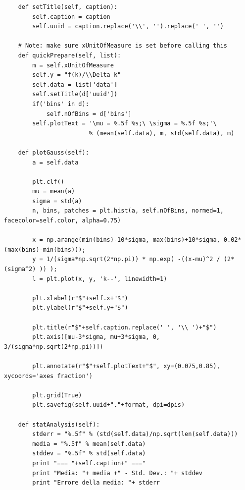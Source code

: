 \documentclass[a4paper,10pt]{report}
\begin{document}
\begin{lstlisting}
    def setTitle(self, caption):
        self.caption = caption
        self.uuid = caption.replace('\\', '').replace(' ', '')
        
    # Note: make sure xUnitOfMeasure is set before calling this
    def quickPrepare(self, list):
        m = self.xUnitOfMeasure
        self.y = "f(k)/\\Delta k"
        self.data = list['data']
        self.setTitle(d['uuid'])
        if('bins' in d):
            self.nOfBins = d['bins']
        self.plotText = '\mu = %.5f %s;\ \sigma = %.5f %s;'\
                        % (mean(self.data), m, std(self.data), m)
        
    def plotGauss(self):
        a = self.data
        
        plt.clf()
        mu = mean(a)
        sigma = std(a)
        n, bins, patches = plt.hist(a, self.nOfBins, normed=1, facecolor=self.color, alpha=0.75)
        
        x = np.arange(min(bins)-10*sigma, max(bins)+10*sigma, 0.02*(max(bins)-min(bins)));
        y = 1/(sigma*np.sqrt(2*np.pi)) * np.exp( -((x-mu)^2 / (2* (sigma^2) )) );
        l = plt.plot(x, y, 'k--', linewidth=1)
        
        plt.xlabel(r"$"+self.x+"$")
        plt.ylabel(r"$"+self.y+"$")
        
        plt.title(r"$"+self.caption.replace(' ', '\\ ')+"$")
        plt.axis([mu-3*sigma, mu+3*sigma, 0, 3/(sigma*np.sqrt(2*np.pi))])
        
        plt.annotate(r"$"+self.plotText+"$", xy=(0.075,0.85), xycoords='axes fraction')
        
        plt.grid(True)
        plt.savefig(self.uuid+"."+format, dpi=dpis)
        
    def statAnalysis(self):
        stderr = "%.5f" % (std(self.data)/np.sqrt(len(self.data)))
        media = "%.5f" % mean(self.data)
        stddev = "%.5f" % std(self.data)
        print "=== "+self.caption+" ==="
        print "Media: "+ media +" - Std. Dev.: "+ stddev
        print "Errore della media: "+ stderr
\end{lstlisting}
\end{document}
